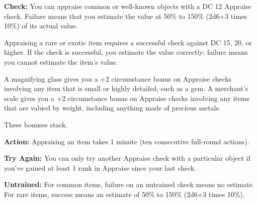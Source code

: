 
\textbf{Check:} You can appraise common or well-known objects with a DC 12 Appraise check. Failure means that you estimate the value at 50\% to 150\% (2d6+3 times 10\%) of its actual value.

Appraising a rare or exotic item requires a successful check against DC 15, 20, or higher. If the check is successful, you estimate the value correctly; failure means you cannot estimate the item's value.

A magnifying glass gives you a +2 circumstance bonus on Appraise checks involving any item that is small or highly detailed, such as a gem. A merchant's scale gives you a +2 circumstance bonus on Appraise checks involving any items that are valued by weight, including anything made of precious metals.

These bonuses stack.

\textbf{Action:} Appraising an item takes 1 minute (ten consecutive full-round actions).

\textbf{Try Again:} You can only try another Appraise check with a particular object if you've gained at least 1 rank in Appraise since your last check.

\textbf{Untrained:} For common items, failure on an untrained check means no estimate. For rare items, success means an estimate of 50\% to 150\% (2d6+3 times 10\%).
